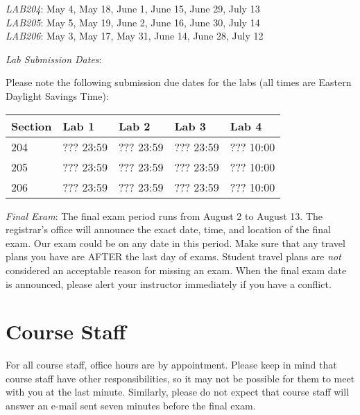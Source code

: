\documentclass[letterpaper,10pt]{article}
\begin{document}
\textit{LAB204}: May 4, May 18, June 1, June 15, June 29, July 13 \\
\textit{LAB205}: May 5, May 19, June 2, June 16, June 30, July 14 \\
\textit{LAB206}: May 3, May 17, May 31, June 14, June 28, July 12 

\textit{Lab Submission Dates}:

Please note the following submission due dates for the labs (all times are Eastern Daylight Savings Time): \\

\begin{table}[h]
        \begin{center}
        \begin{tabular}{l|l|l|l|l}
        	\textbf{Section} & \textbf{Lab 1} & \textbf{Lab 2} & \textbf{Lab 3} & \textbf{Lab 4} \\
			\hline
			204 & ??? 23:59 & ??? 23:59 & ??? 23:59 & ??? 10:00 \\
			\hline
			205 & ??? 23:59 & ??? 23:59 & ??? 23:59 & ??? 10:00 \\
			\hline
			206 & ??? 23:59 & ??? 23:59 & ??? 23:59 & ??? 10:00 \\
        \end{tabular}
        \end{center}
\end{table}

\textit{Final Exam}: The final exam period runs from August 2 to August 13. The registrar's office will announce the exact date, time, and location of the final exam. Our exam could be on any date in this period. Make sure that any travel plans you have are AFTER the last day of exams. Student travel plans are \emph{not} considered an acceptable reason for missing an exam. When the final exam date is announced, please alert your instructor immediately if you have a conflict.

\section*{Course Staff}

For all course staff, office hours are by appointment. Please keep in mind that course staff have other responsibilities, so it may not be possible for them to meet with you at the last minute. Similarly, please do not expect that course staff will answer an e-mail sent seven minutes before the final exam.
\end{document}
